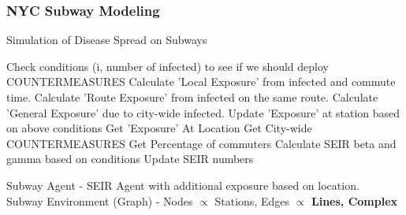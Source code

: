 \documentclass{beamer}
\begin{document}
\begin{frame}[shrink=5]
\frametitle{NYC Subway Modeling}
\begin{algorithm}[H]
\caption{Simulation of Disease Spread on Subways}\label{euclid}
\begin{algorithmic}[1]
    \State Check conditions (i, number of infected) to see if we should deploy COUNTERMEASURES
        \State Calculate 'Local Exposure' from infected and commute time.
        \State Calculate 'Route Exposure' from infected on the same route.
        \State Calculate 'General Exposure' due to city-wide infected.
        \State Update 'Exposure' at station based on above conditions
    \EndFor
        \State Get 'Exposure' At Location
        \State Get City-wide COUNTERMEASURES
        \State Get Percentage of commuters
        \State Calculate SEIR beta and gamma based on conditions
        \State Update SEIR numbers
    \EndFor
\EndFor
\end{algorithmic}
\end{algorithm}
Subway Agent - SEIR Agent with additional exposure based on location. \\
Subway Environment (Graph) - Nodes $\propto$ Stations, Edges $\propto$ \textbf{Lines, Complex}
\end{frame}
\end{document}
